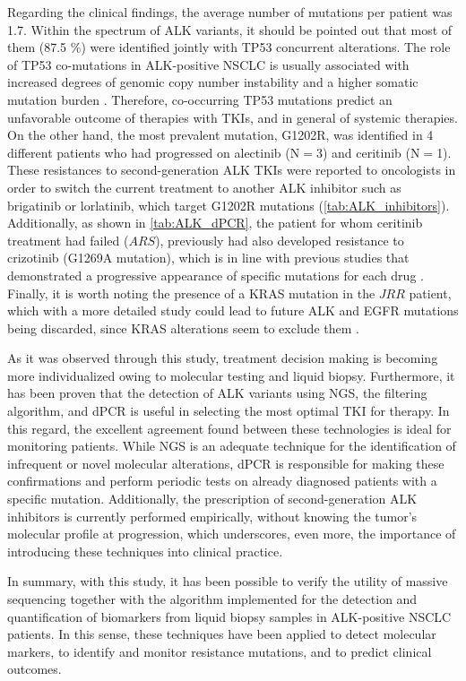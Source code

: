 Regarding the clinical findings, the average number of mutations per patient was 1.7. Within the spectrum of ALK variants, it should be pointed out that most of them (87.5 \%) were identified jointly with TP53 concurrent alterations. The role of TP53 co-mutations in ALK-positive NSCLC is usually associated with increased degrees of genomic copy number instability and a higher somatic mutation burden \cite{NSCLC_alterations}. Therefore, co-occurring TP53 mutations predict an unfavorable outcome of therapies with TKIs, and in general of systemic therapies. On the other hand, the most prevalent mutation, G1202R, was identified in 4 different patients who had progressed on alectinib (N$=$3) and ceritinib (N$=$1). These resistances to second-generation ALK TKIs were reported to oncologists in order to switch the current treatment to another ALK inhibitor such as brigatinib or lorlatinib, which target G1202R mutations (\autoref{tab:ALK_inhibitors}). Additionally, as shown in \autoref{tab:ALK_dPCR}, the patient for whom ceritinib treatment had failed ($ARS$), previously had also developed resistance to crizotinib (G1269A mutation), which is in line with previous studies that demonstrated a progressive appearance of specific mutations for each drug \cite{ALK_resistance, ALK_inhibitors}. Finally, it is worth noting the presence of a KRAS mutation in the $JRR$ patient, which with a more detailed study could lead to future ALK and EGFR mutations being discarded, since KRAS alterations seem to exclude them \cite{Mol_bio, NSCLC_therapies}.

As it was observed through this study, treatment decision making is becoming more individualized owing to molecular testing and liquid biopsy. Furthermore, it has been proven that the detection of ALK variants using NGS, the filtering algorithm, and dPCR is useful in selecting the most optimal TKI for therapy. In this regard, the excellent agreement found between these technologies is ideal for monitoring patients. While NGS is an adequate technique for the identification of infrequent or novel molecular alterations, dPCR is responsible for making these confirmations and perform periodic tests on already diagnosed patients with a specific mutation. Additionally, the prescription of second-generation ALK inhibitors is currently performed empirically, without knowing the tumor's molecular profile at progression, which underscores, even more, the importance of introducing these techniques into clinical practice.

In summary, with this study, it has been possible to verify the utility of massive sequencing together with the algorithm implemented for the detection and quantification of biomarkers from liquid biopsy samples in ALK-positive NSCLC patients. In this sense, these techniques have been applied to detect molecular markers, to identify and monitor resistance mutations, and to predict clinical outcomes.

